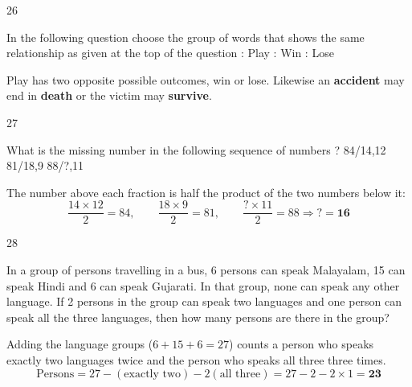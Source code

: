 \begin{question}{26}
{In the following question choose the group of words that shows the same relationship as given at the top of the question : Play : Win : Lose\par}
\begin{explain}
Play has two opposite possible outcomes, win or lose. Likewise an \textbf{accident} may end in \textbf{death} or the victim may \textbf{survive}.
\end{explain}
\end{question}

\begin{question}{27}
{What is the missing number in the following sequence of numbers ? 84/14,12 81/18,9 88/?,11\par}
\begin{explain}
The number above each fraction is half the product of the two numbers below it:
\[\frac{14\times12}{2}=84,\qquad\frac{18\times9}{2}=81,\qquad\frac{?\times11}{2}=88\Rightarrow ?=\mathbf{16}\]
\end{explain}
\end{question}

\begin{question}{28}
{In a group of persons travelling in a bus, 6 persons can speak Malayalam, 15 can speak Hindi and 6 can speak Gujarati. In that group, none can speak any other language. If 2 persons in the group can speak two languages and one person can speak all the three languages, then how many persons are there in the group?\par}
\begin{explain}
Adding the language groups ($6+15+6=27$) counts a person who speaks exactly two languages twice and the person who speaks all three three times.
\[\text{Persons}=27-(\text{exactly two})-2(\text{all three})=27-2-2\times1=\mathbf{23}\]
\end{explain}
\end{question}

